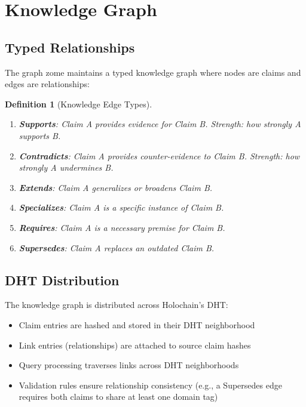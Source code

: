 \documentclass[11pt,twocolumn]{article}
\newtheorem{definition}{Definition}
\begin{document}
\section{Knowledge Graph}

\subsection{Typed Relationships}

The graph zome maintains a typed knowledge graph where nodes are claims
and edges are relationships:

\begin{definition}[Knowledge Edge Types]
\begin{enumerate}[nosep]
  \item \textbf{Supports}: Claim A provides evidence for Claim B.
    Strength: how strongly A supports B.
  \item \textbf{Contradicts}: Claim A provides counter-evidence to Claim B.
    Strength: how strongly A undermines B.
  \item \textbf{Extends}: Claim A generalizes or broadens Claim B.
  \item \textbf{Specializes}: Claim A is a specific instance of Claim B.
  \item \textbf{Requires}: Claim A is a necessary premise for Claim B.
  \item \textbf{Supersedes}: Claim A replaces an outdated Claim B.
\end{enumerate}
\end{definition}

\subsection{DHT Distribution}

The knowledge graph is distributed across Holochain's DHT:

\begin{itemize}[nosep]
  \item Claim entries are hashed and stored in their DHT neighborhood
  \item Link entries (relationships) are attached to source claim hashes
  \item Query processing traverses links across DHT neighborhoods
  \item Validation rules ensure relationship consistency (e.g., a
    Supersedes edge requires both claims to share at least one domain tag)
\end{itemize}
\end{document}
